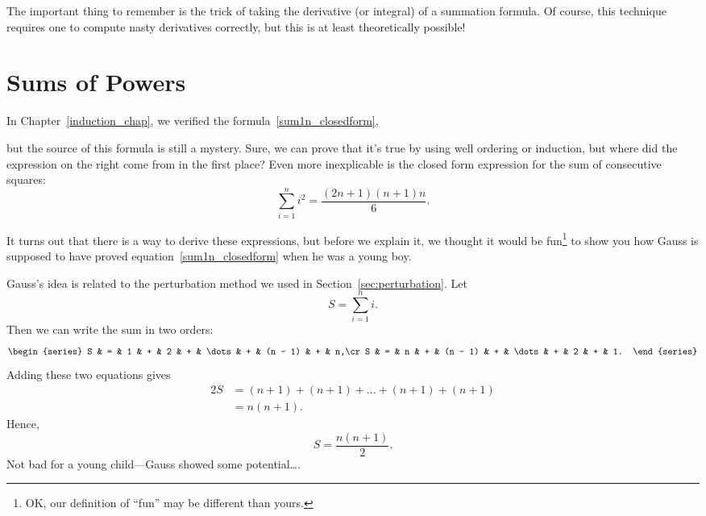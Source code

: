 The important thing to remember is the trick of taking the derivative
(or integral) of a summation formula.  Of course, this technique
requires one to compute nasty derivatives correctly, but this is at
least theoretically possible!

\begin{problems}
\classproblems
{}

\homeworkproblems
{}

\end{problems}

\section{Sums of Powers}\label{sec:sum_powers}

In Chapter~\ref{induction_chap}, we verified the formula~\eqref{sum1n_closedform},

but the source of this formula is still a mystery.  Sure, we can prove
that it's true by using well ordering or induction, but where did the
expression on the right come from in the first place?  Even more
inexplicable is the closed form expression for the sum of consecutive
squares:
\begin{equation}\label{eqn:G27}
    \sum_{i = 1}^n i^2 = \frac{(2n+1) (n+1) n}{6}.
\end{equation}

It turns out that there is a way to derive these expressions, but
before we explain it, we thought it would be fun\footnote{OK, our
  definition of ``fun'' may be different than yours.} to show you how
Gauss is supposed to have proved equation~\ref{sum1n_closedform} when
he was a young boy.

Gauss's idea is related to the perturbation method we used in
Section~\ref{sec:perturbation}.  Let
\[
    S = \sum_{i = 1}^n i.
\]
Then we can write the sum in two orders:
\[
    \begin{series}
        S & = & 1 & + & 2       & + & \dots & + & (n - 1) & + & n,\cr
        S & = & n & + & (n - 1) & + & \dots & + & 2       & + & 1.
    \end{series}
\]
Adding these two equations gives
\begin{align*}
    2S  & = (n + 1) + (n + 1) + \dots + (n + 1) + (n + 1) \\
        & = n (n + 1).
\end{align*}
Hence,
\[
    S = \frac{n (n + 1)}{2}.
\]
Not bad for a young child---Gauss showed some potential\dots.

